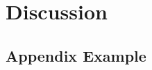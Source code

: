 \documentclass[12pt, a4paper]{report}
\begin{document}
\chapter{Discussion}
\label{Chap4}
\lipsum[9-10]

\renewcommand{\bibname}{Bibliography}



\begin{appendices}
\chapter{Appendix Example}
\end{appendices}
\end{document}
